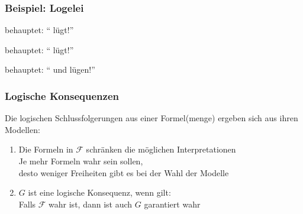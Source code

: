 \documentclass[aspectratio=1610,onlymath]{beamer}
\let\beameroriginaldoublebackslash\\
\let\\=\beameroriginaldoublebackslash
\begin{document}
\begin{frame}\frametitle{Beispiel: Logelei}

\Aname{} behauptet: "`\Bname{} lügt!"'\hfill {}
\bigskip

\Bname{} behauptet: "`\Cname{} lügt!"'\hfill {}
\bigskip

\Cname{} behauptet: "`\Aname{} und \Bname{} lügen!"'\hfill {}
\bigskip\bigskip

{\Large
{}
}

\medskip
{\footnotesize{}}

% 

\end{frame}


\begin{frame}\frametitle{Logische Konsequenzen}

\pause

Die logischen Schlussfolgerungen aus einer Formel(menge) ergeben sich aus ihren Modellen:


\begin{enumerate}[$\leadsto$]
\item Die Formeln in $\mathcal{F}$ schränken die möglichen Interpretationen \\
Je mehr Formeln wahr sein sollen,\\ desto weniger Freiheiten gibt es bei der Wahl der Modelle
\item $G$ ist eine logische Konsequenz, wenn gilt:\\ Falls $\mathcal{F}$ wahr ist, dann ist auch $G$ garantiert wahr
% 
\end{enumerate}

\end{frame}
\end{document}
